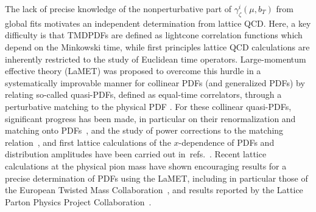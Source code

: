 \documentclass[11pt,a4paper]{article}
\DeclareRobustCommand{\mycites}[1]{refs.~\cite{#1}}
\begin{document}
The lack of precise knowledge of the nonperturbative part of $\gamma_\zeta^i(\mu,b_T)$ from global fits motivates an independent determination from lattice QCD.
Here, a key difficulty is that TMDPDFs are defined as lightcone correlation functions which depend on the Minkowski time, while first principles lattice QCD calculations are inherently restricted to the study of Euclidean time operators. 
Large-momentum effective theory (LaMET) was proposed to overcome this hurdle in a systematically improvable manner for collinear PDFs (and generalized PDFs)
by relating so-called quasi-PDFs, defined as equal-time correlators, through a perturbative matching to the physical PDF  \cite{Ji:2013dva,Ji:2014gla}.
For these collinear quasi-PDFs, significant progress has been made, in particular on their renormalization and matching onto PDFs~\cite{Xiong:2013bka,Ma:2014jla,Ma:2014jga,Ji:2015jwa,Ji:2015qla,Xiong:2015nua,Li:2016amo,Ishikawa:2016znu,Chen:2016fxx,Carlson:2017gpk,Briceno:2017cpo,Xiong:2017jtn,Constantinou:2017sej,Rossi:2017muf,Ji:2017rah,Ji:2017oey,Ishikawa:2017faj,Green:2017xeu,Wang:2017qyg,Chen:2017mie,Stewart:2017tvs,Wang:2017eel,Spanoudes:2018zya,Izubuchi:2018srq,Xu:2018mpf,Rossi:2018zkn,Zhang:2018diq,Li:2018tpe,Liu:2018tox}, and the study of power corrections to the matching relation~\cite{Chen:2016utp,Radyushkin:2017ffo,Braun:2018brg}, and first lattice calculations of the $x$-dependence of PDFs and distribution amplitudes have been carried out in~\mycites{Lin:2014zya,Alexandrou:2015rja,Chen:2016utp,Alexandrou:2016jqi,Zhang:2017bzy,Alexandrou:2017huk,Chen:2017mzz,Green:2017xeu,Chen:2017lnm,Chen:2017gck,Alexandrou:2018pbm,Chen:2018xof,Chen:2018fwa,Alexandrou:2018eet,Liu:2018uuj,Lin:2018qky,Fan:2018dxu,Liu:2018hxv,Cichy:2019ebf,Chai:2019rer}.
Recent lattice calculations at the physical pion mass have shown encouraging results for a precise determination of PDFs using the LaMET, including in particular those
of the European Twisted Mass Collaboration~\cite{Alexandrou:2018pbm,Alexandrou:2018eet}, and results reported by the Lattice Parton Physics Project Collaboration~\cite{Chen:2018xof,Lin:2018qky,Liu:2018hxv}.
\end{document}
